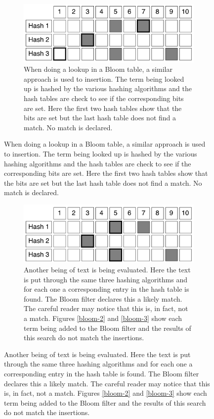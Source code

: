 \documentclass{article}
\begin{document}
\begin{figure}[h!bt]
  \ContinuedFloat  
  \label{bloom-4}
  \centering
  \begin{subfigure}{\textwidth}
  \makeatletter
  \includegraphics[width=\textwidth]{images/bloom-4}
  \caption{When doing a lookup in a Bloom table, a similar approach is used to insertion. The term being looked up is hashed by the various hashing algorithms and the hash tables are check to see if the corresponding bits are set. Here the first two hash tables show that the bits are set but the last hash table does not find a match. No match is declared.}
  \end{subfigure}
\end{figure}

\begin{figure}[h!bt]
  \ContinuedFloat  
  \label{bloom-5}
  \centering
  \begin{subfigure}{\textwidth}
  \makeatletter
  \includegraphics[width=\textwidth]{images/bloom-5}
  \caption{Another being of text is being evaluated. Here the text is put through the same three hashing algorithms and for each one a corresponding entry in the hash table is found. The Bloom filter declares this a likely match. The careful reader may notice that this is, in fact, not a match. Figures \ref{bloom-2} and \ref{bloom-3} show each term being added to the Bloom filter and the results of this search do not match the insertions.}
  \end{subfigure}
\end{figure}
\end{document}

